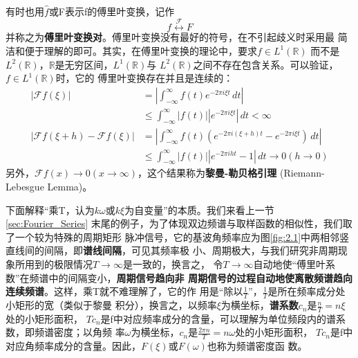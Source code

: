 \documentclass{ctexbook}
\begin{document}
有时也用$\hat{f}$或F表示f的傅里叶变换，记作
\[f\overset{\mathcal{F} }{\longleftrightarrow}F\]
并称之为\textbf{傅里叶变换对}。傅里叶变换没有最好的符号，在不引起歧义时采用最
简洁和便于理解的即可。其实，在傅里叶变换的理论中，要求$f\in L^1(\mathbb{R})$
而不是$L^2(\mathbb{R})$，$\mathbb{R}$是无穷区间，$L^1(\mathbb{R})$与
$L^2(\mathbb{R})$之间不存在包含关系。可以验证，$f\in L^1(\mathbb{R})$时，它的
傅里叶变换存在并且是连续的：\begin{align*}
    |\mathcal{F} f(\xi)|                      & =\left|\int_{-\infty}^{\infty}f(t)e^{-2\pi i\xi t}\,dt\right|                       \\
                                              & \leq\int_{-\infty}^{\infty}|f(t)||e^{-2\pi i\xi t}|\,dt<\infty                      \\
    |\mathcal{F} f(\xi+h)-\mathcal{F} f(\xi)| & =\left|\int_{-\infty}^{\infty}f(t)(e^{-2\pi i(\xi+h)t}-e^{-2\pi i\xi t})\,dt\right| \\
                                              & \leq\int_{-\infty}^{\infty}|f(t)||e^{-2\pi iht}-1|\,dt\to 0(h\to 0)
\end{align*}
另外，$\mathcal{F} f(x)\to 0(x\to\infty)$，这个结果称为\textbf{黎曼-勒贝格引理} (Riemann-Lebesgue Lemma)。

下面解释“乘T，认为$k\omega$或$k\xi$为自变量”的本质。我们来看上一节\ref{sec:Fourier_Series}
末尾的例子，为了体现双边频谱与取样函数的相似性，我们取了一个较为特殊的周期矩形
脉冲信号，它的基波角频率应为图\ref{fig:2.1}中两相邻竖直线间的间隔，即\textbf{谱线间隔}，可见其频率极
小、周期极大，与我们研究非周期现象所用到的极限情况$T\to\infty$是一致的，换言之，
令$T\to\infty$自动地使“傅里叶系数”在频谱中的间隔变小，\textbf{周期信号趋向非
    周期信号的过程自动地使离散频谱趋向连续频谱}。这样，乘T就不难理解了，它的作
用是“除以$\frac{1}{T}$”，$\frac{1}{T}$是所在频率成分处小矩形的宽（类似于黎曼
积分），换言之，以频率$\xi$为横坐标，\textbf{谱系数}$c_n$是$\frac{n}{T}=n\xi$处的小矩形面积，
$Tc_n$是f中对应频率成分的含量，可以理解为单位频段内的谱系数，即频谱密度；以角频
率$\omega$为横坐标，$c_n$是$\frac{2\pi n}{T}=n\omega$处的小矩形面积，
$Tc_n$是f中对应角频率成分的含量。因此，$F(\xi)$或$F(\omega)$也称为频谱密度函
数。
\end{document}
